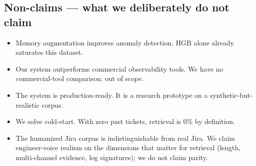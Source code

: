 \subsection{Non-claims --- what we deliberately do not claim}

\begin{itemize}
\item Memory augmentation improves anomaly detection. HGB alone already saturates this dataset.
\item Our system outperforms commercial observability tools. We have no commercial-tool comparison; out of scope.
\item The system is production-ready. It is a research prototype on a synthetic-but-realistic corpus.
\item We solve cold-start. With zero past tickets, retrieval is $0\%$ by definition.
\item The humanized Jira corpus is indistinguishable from real Jira. We claim engineer-voice realism on the dimensions that matter for retrieval (length, multi-channel evidence, log signatures); we do not claim parity.
\end{itemize}
